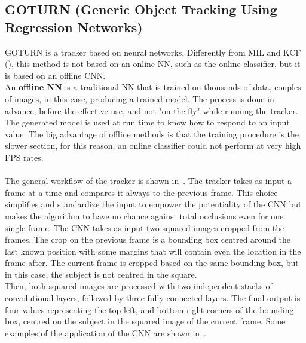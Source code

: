 \subsection{GOTURN (Generic Object Tracking Using Regression Networks)}
GOTURN\cite{goturn} is a tracker based on neural networks. Differently from MIL and KCF (), this method is not based on an online NN, such as the online classifier, but it is based on an offline CNN.\\
An \textbf{offline NN} is a traditional NN that is trained on thousands of data, couples of images, in this case, producing a trained model. The process is done in advance, before the effective use, and not "on the fly" while running the tracker. The generated model is used at run time to know how to respond to an input value. The big advantage of offline methods is that the training procedure is the slower section, for this reason, an online classifier could not perform at very high FPS rates.\\
\\
The general workflow of the tracker is shown in~. The tracker takes as input a frame at a time and compares it always to the previous frame. This choice simplifies and standardize the input to empower the potentiality of the CNN but makes the algorithm to have no chance against total occlusions even for one single frame. The CNN takes as input two squared images cropped from the frames. The crop on the previous frame is a bounding box centred around the last known position with some margins that will contain even the location in the frame after. The current frame is cropped based on the same bounding box, but in this case, the subject is not centred in the square.\\
Then, both squared images are processed with two independent stacks of convolutional layers, followed by three fully-connected layers. The final output is four values representing the top-left, and bottom-right corners of the bounding box, centred on the subject in the squared image of the current frame. Some examples of the application of the CNN are shown in~.

